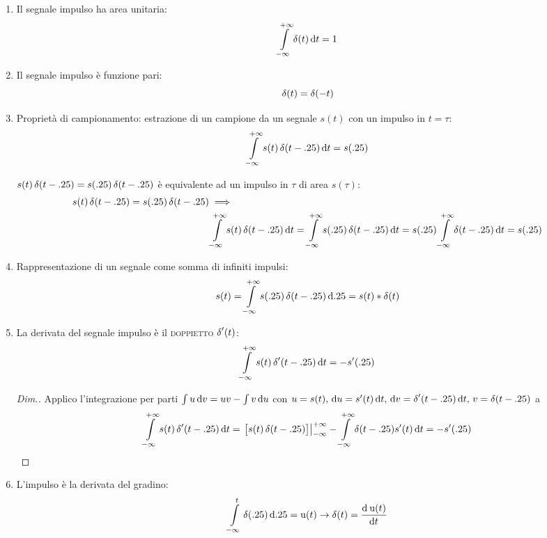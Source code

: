 \begin{enumerate}
	\item Il segnale impulso ha area unitaria:
	\begin{equation}
		\intinf{\impulse(t)}{t}=1
	\end{equation}
	\item Il segnale impulso è funzione pari:
	\begin{equation}
		\impulse(t)=\impulse(-t)
	\end{equation}
	\item Proprietà di campionamento: estrazione di un campione da un segnale $s(t)$ con un impulso in $t=\tau$:
	\begin{equation}
		\intinf{s(t)\impulse(t-\tau)}{t}=s(\tau)
	\end{equation}

	$s(t)\impulse(t-\tau)=s(\tau)\impulse(t-\tau)$ è equivalente ad un impulso in $\tau$ di area $s(\tau)$:
	\begin{align*}
		s(t)\impulse(t-\tau)=s(\tau)\impulse(t-\tau) &\implies \\
		& \intinf{s(t)\impulse(t-\tau)}{t} =\intinf{s(\tau)\impulse(t-\tau)}{t} = s(\tau)\intinf{\impulse(t-\tau)}{t} = s(\tau)
	\end{align*}

	\item Rappresentazione di un segnale come somma di infiniti impulsi:
	\begin{equation}
		s(t)=\intinf{s(\tau)\impulse(t-\tau)}{\tau}=s(t)\ast\impulse(t)
	\end{equation}

	\item La derivata del segnale impulso è il \textsc{doppietto} $\impulse'(t)$:
	\begin{equation}
		\intinf{s(t)\impulse'(t-\tau)}{t}=-s'(\tau)
	\end{equation}

	\begin{proof}[Dim.]
		Applico l'integrazione per parti $\int{u\diff v}=u v-\int{v\diff u}$ con $u=s(t) ,\, \diff u=s'(t)\diff t ,\, \diff v=\impulse'(t-\tau)\diff t ,\, v=\impulse(t-\tau)$  a
		\[
			\intinf{s(t)\impulse'(t-\tau)}{t}= \restrict{\bigl[ s(t)\impulse(t-\tau)\bigr]}{-\infty}^{+\infty} -\intinf{\impulse(t-\tau)s'(t)}{t}=-s'(\tau)
		\]
	\end{proof}
	\item L'impulso è la derivata del gradino:
	\begin{equation}
		\intd{-\infty}{t}{\impulse(\tau)}{\tau}=\step(t) \to \impulse(t)=\deriv{\step(t)}{t}
	\end{equation}


\end{enumerate}

